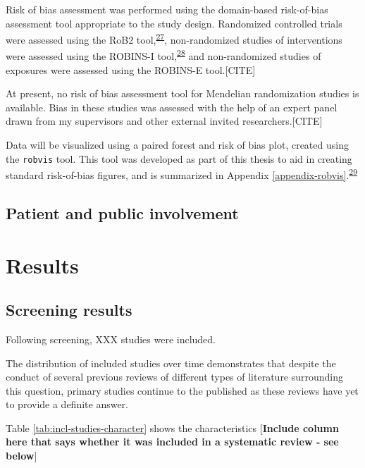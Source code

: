 \documentclass[a4paper, twoside]{templates/ociamthesis}
\begin{document}
Risk of bias assessment was performed using the domain-based risk-of-bias assessment tool appropriate to the study design. Randomized controlled trials were assessed using the RoB2 tool,\textsuperscript{\protect\hyperlink{ref-sterne2019}{27}}, non-randomized studies of interventions were assessed using the ROBINS-I tool,\textsuperscript{\protect\hyperlink{ref-sterne2016}{28}} and non-randomized studies of exposures were assessed using the ROBINS-E tool.{[}CITE{]}

At present, no risk of bias assessment tool for Mendelian randomization studies is available. Bias in these studies was assessed with the help of an expert panel drawn from my supervisors and other external invited researchers.{[}CITE{]}

Data will be visualized using a paired forest and risk of bias plot, created using the \texttt{robvis} tool. This tool was developed as part of this thesis to aid in creating standard risk-of-bias figures, and is summarized in Appendix \ref{appendix-robvis}.\textsuperscript{\protect\hyperlink{ref-mcguinness2019}{29}}

\hypertarget{patient-and-public-involvement}{%
\subsection{Patient and public involvement}\label{patient-and-public-involvement}}

\hypertarget{results}{%
\section{Results}\label{results}}

\hypertarget{screening-results}{%
\subsection{Screening results}\label{screening-results}}

Following screening, XXX studies were included.

The distribution of included studies over time demonstrates that despite the conduct of several previous reviews of different types of literature surrounding this question, primary studies continue to the published as these reviews have yet to provide a definite answer.

Table \ref{tab:incl-studies-character} shows the characteristics {[}\textbf{Include column here that says whether it was included in a systematic review - see below}{]}
\end{document}
